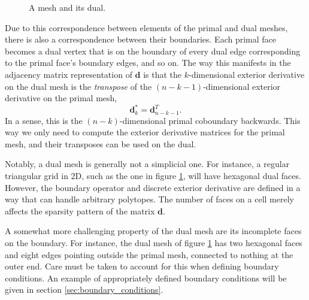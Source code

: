 \documentclass[utf8,english]{gradu3}
\begin{document}
\begin{figure}[h]
  \centering
  \caption{A mesh and its dual.}
  \label{fig:dual_mesh}
\end{figure}

Due to this correspondence between elements of the primal and dual meshes,
there is also a correspondence between their boundaries.
Each primal face becomes a dual vertex that is on the boundary
of every dual edge corresponding to the primal face's boundary edges, and so on.
The way this manifests in the adjacency matrix representation of $\mathbf{d}$
is that the $k$-dimensional exterior derivative
on the dual mesh is the \textit{transpose} of the $(n-k-1)$-dimensional
exterior derivative on the primal mesh,
\[
  \mathbf{d}^*_k = \mathbf{d}_{n-k-1}^T.
\]
In a sense, this is the $(n-k)$-dimensional primal coboundary backwards.
This way we only need to compute the exterior derivative matrices
for the primal mesh, and their transposes can be used on the dual.

Notably, a dual mesh is generally not a simplicial one.
For instance, a regular triangular grid in 2D,
such as the one in figure \ref{fig:dual_mesh}, will have hexagonal dual faces.
However, the boundary operator and discrete exterior derivative
are defined in a way that can handle arbitrary polytopes.
The number of faces on a cell merely affects the sparsity pattern
of the matrix $\mathbf{d}$.

A somewhat more challenging property of the dual mesh
are its incomplete faces on the boundary.
For instance, the dual mesh of figure \ref{fig:dual_mesh} has two hexagonal faces
and eight edges pointing outside the primal mesh, connected to nothing at the outer end.
Care must be taken to account for this when defining boundary conditions.
An example of appropriately defined boundary conditions
will be given in section \ref{sec:boundary_conditions}.
\end{document}
